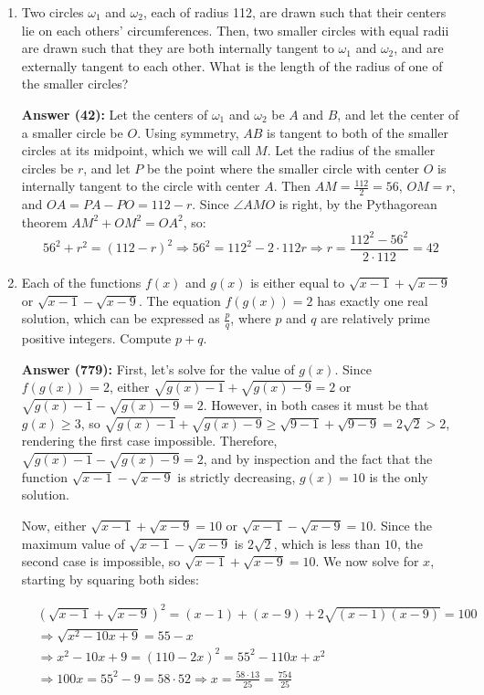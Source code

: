 \documentclass{article}
\begin{document}
\begin{enumerate}

\item Two circles $\omega_1$ and $\omega_2$, each of radius 112, are drawn such that their centers lie on each others’ circumferences. Then, two smaller circles with equal radii are drawn such that they are both internally tangent to $\omega_1$ and $\omega_2$, and are externally tangent to each other. What is the length of the radius of one of the smaller circles?

\textbf{Answer (42):} Let the centers of $\omega_1$ and $\omega_2$ be $A$ and $B$, and let the center of a smaller circle be $O$. Using symmetry, $AB$ is tangent to both of the smaller circles at its midpoint, which we will call $M$. Let the radius of the smaller circles be $r$, and let $P$ be the point where the smaller circle with center $O$ is internally tangent to the circle with center $A$. Then $AM = \frac{112}{2} = 56$, $OM = r$, and $OA = PA-PO = 112-r$. Since $\angle AMO$ is right, by the Pythagorean theorem $AM^2+OM^2=OA^2$, so: \[ 56^2+r^2=(112-r)^2 \Rightarrow 56^2 = 112^2-2\cdot 112r \Rightarrow r= \frac{112^2-56^2}{2 \cdot 112} = \boxed{42} \] 

\item Each of the functions $f(x)$ and $g(x)$ is either equal to $\sqrt{x-1}+\sqrt{x-9}$ or $\sqrt{x-1}-\sqrt{x-9}$. The equation $f(g(x))=2$ has exactly one real solution, which can be expressed as $\frac{p}{q}$, where $p$ and $q$ are relatively prime positive integers. Compute $p+q$.

\textbf{Answer (779):} First, let's solve for the value of $g(x)$. Since $f(g(x))=2$, either $\sqrt{g(x)-1}+\sqrt{g(x)-9}=2$ or $\sqrt{g(x)-1}-\sqrt{g(x)-9}=2$. However, in both cases it must be that $g(x) \ge 3$, so $\sqrt{g(x)-1}+\sqrt{g(x)-9} \ge \sqrt{9-1}+\sqrt{9-9} = 2\sqrt{2} > 2$, rendering the first case impossible. Therefore, $\sqrt{g(x)-1}-\sqrt{g(x)-9}=2$, and by inspection and the fact that the function $\sqrt{x-1}-\sqrt{x-9}$ is strictly decreasing, $g(x)=10$ is the only solution.

Now, either $\sqrt{x-1}+\sqrt{x-9}=10$ or $\sqrt{x-1}-\sqrt{x-9}=10$. Since the maximum value of $\sqrt{x-1}-\sqrt{x-9}$ is $2\sqrt{2}$, which is less than $10$, the second case is impossible, so $\sqrt{x-1}+\sqrt{x-9}=10$. We now solve for $x$, starting by squaring both sides:

\begin{align*}
    &(\sqrt{x-1}+\sqrt{x-9})^2 = (x-1)+(x-9)+2\sqrt{(x-1)(x-9)} = 100 \\
    &\Rightarrow \sqrt{x^2-10x+9}=55-x \\
    &\Rightarrow x^2-10x+9=(110-2x)^2=55^2-110x+x^2 \\
    &\Rightarrow 100x=55^2-9=58\cdot 52 \Rightarrow x=\frac{58\cdot 13}{25}=\frac{754}{25}
\end{align*}


\end{enumerate}
\end{document}
